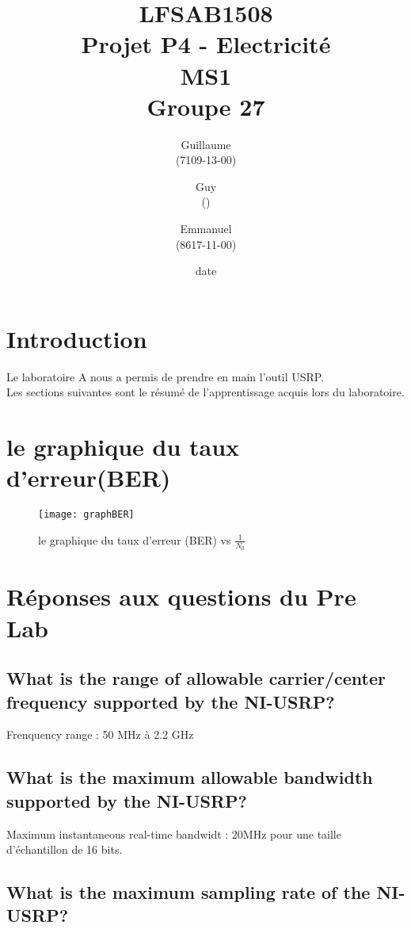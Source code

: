 \documentclass[11pt]{article}
\title{\textbf{LFSAB1508\\ Projet P4 - Electricité \\ MS1} \\ {\large Groupe 27}}
\author{Guillaume \bsc{Lamine} \\(7109-13-00) \and Guy \bsc{Mavungu Zola Lutete} \\()  \and Emmanuel \bsc{Dushimimana} \\ (8617-11-00)}
\date{date}
\date{\vspace*{25mm}
\texttt{[image: logo.jpg]}\\
		\vspace*{30mm} 
		\begin{center}
		Année académique 2015-2016 \\	
		\end{center}}
\begin{document}
\thispagestyle{empty}

\maketitle
\thispagestyle{empty}
\setcounter{tocdepth}{3}
\setcounter{page}{1}
\newpage


\section*{Introduction}
Le laboratoire A nous a permis de prendre en main l'outil USRP. \\ Les sections suivantes sont le résumé de l'apprentissage acquis lors du laboratoire.

\section{le graphique du taux d'erreur(BER)}

 \begin{figure}[!h]
     \centering
     \texttt{[image: graphBER]}
     \caption{le graphique du taux d'erreur (BER) vs $\frac{1}{N_0}$}
     \label{ber}
 \end{figure}
 
\section{Réponses aux questions du Pre Lab}
 
\subsection{What is the range of allowable carrier/center frequency supported by
the NI-USRP?}

Frenquency range : 50 MHz à 2.2 GHz

\subsection{What is the maximum allowable bandwidth supported by the NI-USRP?}

Maximum instantaneous real-time bandwidt : 20MHz pour une taille d'échantillon de 16 bits.

\subsection{What is the maximum sampling rate of the NI-USRP?}
\end{document}
